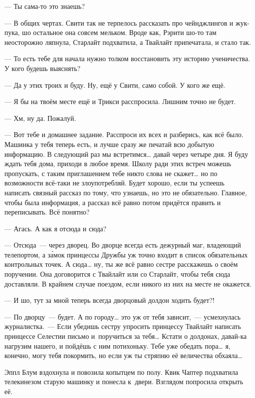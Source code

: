 \documentclass[fontsize=11pt,a5paper,titlepage=firstcover]{scrbook}
\begin{document}
--- Ты сама-то это знаешь?

--- В общих чертах. Свити так не терпелось рассказать про чейнджлингов и жук-пука, шо остальное она совсем мельком. Вроде как, Рэрити шо-то там неосторожно ляпнула, Старлайт подхватила, а Твайлайт припечатала, и стало так.

--- То есть тебе для начала нужно толком восстановить эту историю ученичества. У кого будешь выяснять?

--- Да у этих троих и буду. Ну, ещё у Свити, само собой. У кого же ещё.

--- Я бы на твоём месте ещё и Трикси расспросила. Лишним точно не будет.

--- Хм, ну да. Пожалуй.

--- Вот тебе и домашнее задание. Расспроси их всех и разберись, как всё было. Машинка у тебя теперь есть, и лучше сразу же печатай всю добытую информацию. В следующий раз мы встретимся{\ldots} давай через четыре дня. Я буду ждать тебя дома, приходи в любое время. Школу ради этих встреч можешь пропускать, с таким приглашением тебе никто слова не скажет{\ldots} но по возможности всё-таки не злоупотребляй. Будет хорошо, если ты успеешь написать связный рассказ по тому, что узнаешь, но это не обязательно. Главное, чтобы была информация, а рассказ всё равно потом придётся править и переписывать. Всё понятно?

--- Агась. А как я отсюда и сюда?

--- Отсюда~--- через дворец. Во дворце всегда есть дежурный маг, владеющий телепортом, а за́мок принцессы Дружбы уж точно входит в список обязательных контрольных точек. А сюда{\ldots} ну, ты же всё равно сестре расскажешь о своём поручении. Она договорится с Твайлайт или со Старлайт, чтобы тебя сюда доставляли. В крайнем случае поездом, если никого из них на месте не окажется.

--- И шо, тут за мной теперь всегда дворцовый долдон ходить будет?!

--- По дворцу~--- будет. А по городу{\ldots} это уж от тебя зависит,~--- усмехнулась журналистка.~--- Если убедишь сестру упросить принцессу Твайлайт написать принцессе Селестии письмо и~поручиться за тебя{\ldots} Кстати о долдонах, давай-ка нагрузим нашего, и пойдёшь с ним потихоньку. Тебе уже обедать пора{\ldots} я, конечно, могу тебя покормить, но если уж ты стряпню её величества обхаяла{\ldots}

Эппл Блум вздохнула и повозила копытцем по полу. Квик Чаптер подхватила телекинезом старую машинку и понесла к~двери. Взглядом попросила открыть её.
\end{document}
